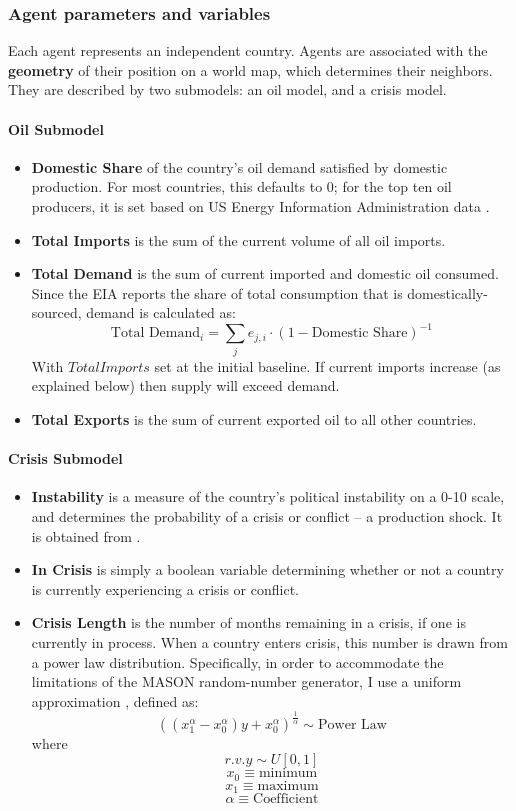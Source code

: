 \documentclass{article}
\begin{document}
\subsubsection{Agent parameters and variables}

Each agent represents an independent country. Agents are associated with the \textbf{geometry} of their position on a world map, which determines their neighbors. They are described by two submodels: an oil model, and a crisis model.

\paragraph{Oil Submodel}
\begin{itemize}
	\item \textbf{Domestic Share} of the country's oil demand satisfied by domestic production. For most countries, this defaults to 0; for the top ten oil producers, it is set based on US Energy Information Administration data \citep{eia_2013}.
	\item \textbf{Total Imports} is the sum of the current volume of all oil imports. 
	\item \textbf{Total Demand} is the sum of current imported and domestic oil consumed. Since the EIA reports the share of total consumption that is domestically-sourced, demand is calculated as: $$\text{Total Demand}_i = \sum_j e_{j,i} \cdot (1 - \text{Domestic Share})^{-1}$$
	With $Total Imports$ set at the initial baseline. If current imports increase (as explained below) then supply will exceed demand. 
	\item \textbf{Total Exports} is the sum of current exported oil to all other countries.
\end{itemize}

\paragraph{Crisis Submodel}
\begin{itemize}
	\item \textbf{Instability} is a measure of the country's political instability on a 0-10 scale, and determines the probability of a crisis or conflict -- a production shock. It is obtained from \citet{eiu_2013}. 
	\item \textbf{In Crisis} is simply a boolean variable determining whether or not a country is currently experiencing a crisis or conflict.
	\item \textbf{Crisis Length} is the number of months remaining in a crisis, if one is currently in process. When a country enters crisis, this number is drawn from a power law distribution. Specifically, in order to accommodate the limitations of the MASON random-number generator, I use a uniform approximation \citep{weisstein_2013}, defined as:
$$
\left((x_{1}^{\alpha} - x_{0}^{\alpha})y + x_{0}^{\alpha}\right)^{\frac{1}{\alpha}} \sim \text{Power Law}
$$
where 
$$r.v. y \sim U[0,1]$$
$$ x_0  \equiv \text{minimum}$$
$$ x_1  \equiv \text{maximum}$$
$$ \alpha \equiv \text{Coefficient}$$

\end{itemize}
\end{document}
